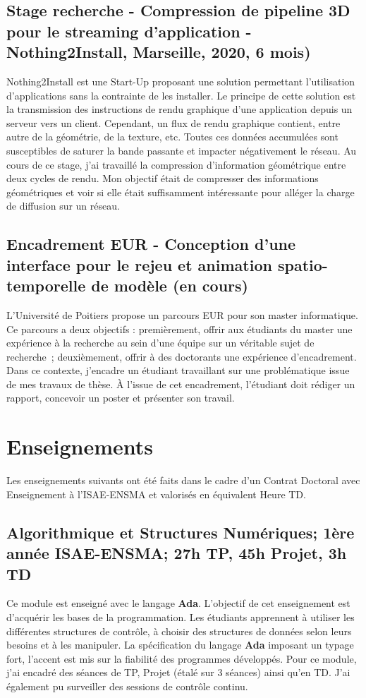 \documentclass[11pt,a4paper,oneside]{article}
\begin{document}
\subsection{Stage recherche - Compression de pipeline 3D pour le streaming d'application - Nothing2Install, Marseille, 2020, 6 mois)}

Nothing2Install est une Start-Up proposant une solution permettant l'utilisation
d'applications sans la contrainte de les installer. %
Le principe de cette solution est la transmission des instructions de rendu
graphique d'une application depuis un serveur vers un client. %
Cependant, un flux de rendu graphique contient, entre autre de la géométrie, de
la texture, etc. %
Toutes ces données accumulées sont susceptibles de saturer la bande passante et
impacter négativement le réseau. %
Au cours de ce stage, j'ai travaillé la compression d'information géométrique
entre deux cycles de rendu. %
Mon objectif était de compresser des informations géométriques et voir si elle
était suffisamment intéressante pour alléger la charge de diffusion sur un
réseau. %


\subsection{Encadrement EUR - Conception d'une interface pour le rejeu et animation spatio-temporelle de modèle (en cours)}
L'Université de Poitiers propose un parcours EUR pour son master informatique. %
Ce parcours a deux objectifs : premièrement, offrir aux étudiants du master une
expérience à la recherche au sein d'une équipe sur un véritable sujet de
recherche~; deuxièmement, offrir à des doctorants une expérience
d'encadrement. %
Dans ce contexte, j'encadre un étudiant travaillant sur une problématique issue
de mes travaux de thèse. %
À l'issue de cet encadrement, l'étudiant doit rédiger un rapport, concevoir un
poster et présenter son travail. %


\section{Enseignements}

Les enseignements suivants ont été faits dans le cadre d'un Contrat Doctoral avec
Enseignement à l'ISAE-ENSMA et valorisés en équivalent Heure TD.

\subsection{Algorithmique et Structures Numériques; 1ère année ISAE-ENSMA; 27h TP, 45h Projet, 3h TD}
Ce module est enseigné avec le langage \textbf{Ada}. %
L'objectif de cet enseignement est d'acquérir les bases de la programmation. %
Les étudiants apprennent à utiliser les différentes structures de contrôle, à
choisir des structures de données selon leurs besoins et à les manipuler. %
La spécification du langage \textbf{Ada} imposant un typage fort, l'accent est mis sur la
fiabilité des programmes développés. %
Pour ce module, j'ai encadré des séances de TP, Projet (étalé sur 3 séances)
ainsi qu'en TD. %
J'ai également pu surveiller des sessions de contrôle continu. %
\end{document}
